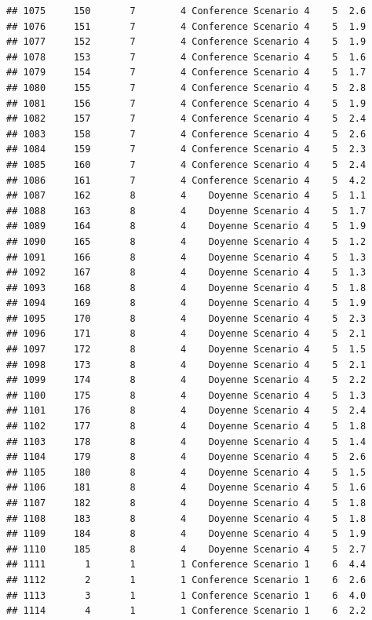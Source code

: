 \documentclass[
]{article}
\begin{document}
\begin{verbatim}
## 1075     150       7        4 Conference Scenario 4    5  2.6
## 1076     151       7        4 Conference Scenario 4    5  1.9
## 1077     152       7        4 Conference Scenario 4    5  1.9
## 1078     153       7        4 Conference Scenario 4    5  1.6
## 1079     154       7        4 Conference Scenario 4    5  1.7
## 1080     155       7        4 Conference Scenario 4    5  2.8
## 1081     156       7        4 Conference Scenario 4    5  1.9
## 1082     157       7        4 Conference Scenario 4    5  2.4
## 1083     158       7        4 Conference Scenario 4    5  2.6
## 1084     159       7        4 Conference Scenario 4    5  2.3
## 1085     160       7        4 Conference Scenario 4    5  2.4
## 1086     161       7        4 Conference Scenario 4    5  4.2
## 1087     162       8        4    Doyenne Scenario 4    5  1.1
## 1088     163       8        4    Doyenne Scenario 4    5  1.7
## 1089     164       8        4    Doyenne Scenario 4    5  1.9
## 1090     165       8        4    Doyenne Scenario 4    5  1.2
## 1091     166       8        4    Doyenne Scenario 4    5  1.3
## 1092     167       8        4    Doyenne Scenario 4    5  1.3
## 1093     168       8        4    Doyenne Scenario 4    5  1.8
## 1094     169       8        4    Doyenne Scenario 4    5  1.9
## 1095     170       8        4    Doyenne Scenario 4    5  2.3
## 1096     171       8        4    Doyenne Scenario 4    5  2.1
## 1097     172       8        4    Doyenne Scenario 4    5  1.5
## 1098     173       8        4    Doyenne Scenario 4    5  2.1
## 1099     174       8        4    Doyenne Scenario 4    5  2.2
## 1100     175       8        4    Doyenne Scenario 4    5  1.3
## 1101     176       8        4    Doyenne Scenario 4    5  2.4
## 1102     177       8        4    Doyenne Scenario 4    5  1.8
## 1103     178       8        4    Doyenne Scenario 4    5  1.4
## 1104     179       8        4    Doyenne Scenario 4    5  2.6
## 1105     180       8        4    Doyenne Scenario 4    5  1.5
## 1106     181       8        4    Doyenne Scenario 4    5  1.6
## 1107     182       8        4    Doyenne Scenario 4    5  1.8
## 1108     183       8        4    Doyenne Scenario 4    5  1.8
## 1109     184       8        4    Doyenne Scenario 4    5  1.9
## 1110     185       8        4    Doyenne Scenario 4    5  2.7
## 1111       1       1        1 Conference Scenario 1    6  4.4
## 1112       2       1        1 Conference Scenario 1    6  2.6
## 1113       3       1        1 Conference Scenario 1    6  4.0
## 1114       4       1        1 Conference Scenario 1    6  2.2

\end{verbatim}
\end{document}
